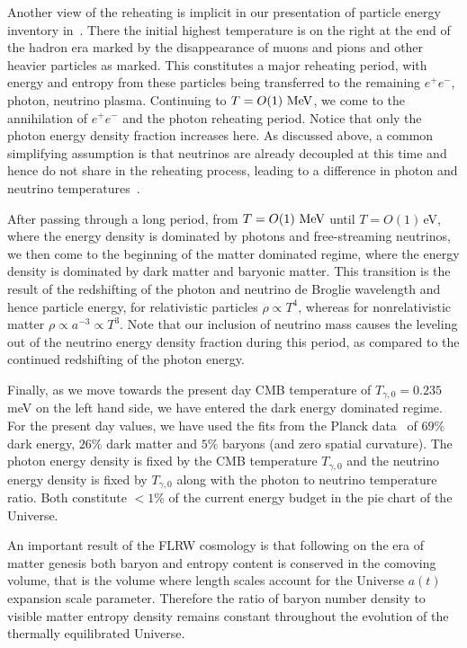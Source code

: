 Another view of the reheating is implicit in our presentation of particle energy inventory in~. There the initial highest temperature is on the right at the end of the hadron era marked by the disappearance of muons and pions and other heavier particles as marked. This constitutes a major reheating period, with energy and entropy from these particles being transferred to the remaining $e^+e^-$, photon, neutrino plasma. Continuing to $T=O(1)\text{ MeV}$, we come to the annihilation of $e^+e^-$ and the photon reheating period. Notice that only the photon energy density fraction increases here. As discussed above, a common simplifying assumption is that neutrinos are already decoupled at this time and hence do not share in the reheating process, leading to a difference in photon and neutrino temperatures~.

After passing through a long period, from $T=O(1)\text{ MeV}$ until $T=O(1)$\,eV, where the energy density is dominated by photons and free-streaming neutrinos, we then come to the beginning of the matter dominated regime, where the energy density is dominated by dark matter and baryonic matter. This transition is the result of the redshifting of the photon and neutrino de Broglie wavelength and hence particle energy, for relativistic particles $\rho\propto T^4$, whereas for nonrelativistic matter $\rho\propto a^{-3}\propto T^3$. Note that our inclusion of neutrino mass causes the leveling out of the neutrino energy density fraction during this period, as compared to the continued redshifting of the photon energy.

Finally, as we move towards the present day CMB temperature of $T_{\gamma,0}=0.235$ meV on the left hand side, we have entered the dark energy dominated regime. For the present day values, we have used the fits from the Planck data~\cite{Planck:2018vyg,Planck:2015fie,Planck:2013pxb} of $69\%$ dark energy, $26\%$ dark matter and $5\%$ baryons (and zero spatial curvature). The photon energy density is fixed by the CMB temperature $T_{\gamma,0}$ and the neutrino energy density is fixed by $T_{\gamma,0}$ along with the photon to neutrino temperature ratio. Both constitute $<1\%$ of the current energy budget in the pie chart of the Universe.


An important result of the FLRW cosmology is that following on the era of matter genesis both baryon and entropy content is conserved in the comoving volume, that is the volume where length scales account for the Universe $a(t)$ expansion scale parameter. Therefore the ratio of baryon number density to visible matter entropy density remains constant throughout the evolution of the thermally equilibrated Universe. 

